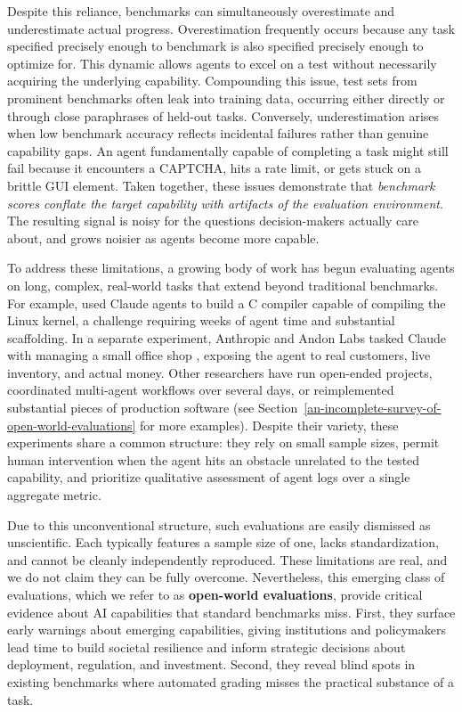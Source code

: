\documentclass{article}
\begin{document}
Despite this reliance, benchmarks can simultaneously overestimate and underestimate actual progress. Overestimation frequently occurs because any task specified precisely enough to benchmark is also specified precisely enough to optimize for. This dynamic allows agents to excel on a test without necessarily acquiring the underlying capability. Compounding this issue, test sets from prominent benchmarks often leak into training data, occurring either directly or through close paraphrases of held-out tasks. Conversely, underestimation arises when low benchmark accuracy reflects incidental failures rather than genuine capability gaps. An agent fundamentally capable of completing a task might still fail because it encounters a CAPTCHA, hits a rate limit, or gets stuck on a brittle GUI element. Taken together, these issues demonstrate that \emph{benchmark scores conflate the target capability with artifacts of the evaluation environment}. The resulting signal is noisy for the questions decision-makers actually care about, and grows noisier as agents become more capable.

To address these limitations, a growing body of work has begun evaluating agents on long, complex, real-world tasks that extend beyond traditional benchmarks. For example, \citet{anthropicComEngineeringBuilding} used Claude agents to build a C compiler capable of compiling the Linux kernel, a challenge requiring weeks of agent time and substantial scaffolding. In a separate experiment, Anthropic and Andon Labs tasked Claude with managing a small office shop \citep{anthropicComResearchProject2}, exposing the agent to real customers, live inventory, and actual money. Other researchers have run open-ended projects, coordinated multi-agent workflows over several days, or reimplemented substantial pieces of production software (see Section~\ref{an-incomplete-survey-of-open-world-evaluations} for more examples). Despite their variety, these experiments share a common structure: they rely on small sample sizes, permit human intervention when the agent hits an obstacle unrelated to the tested capability, and prioritize qualitative assessment of agent logs over a single aggregate metric.

Due to this unconventional structure, such evaluations are easily dismissed as unscientific. Each typically features a sample size of one, lacks standardization, and cannot be cleanly independently reproduced. These limitations are real, and we do not claim they can be fully overcome. Nevertheless, this emerging class of evaluations, which we refer to as \textbf{open-world evaluations}, provide critical evidence about AI capabilities that standard benchmarks miss. First, they surface early warnings about emerging capabilities, giving institutions and policymakers lead time to build societal resilience and inform strategic decisions about deployment, regulation, and investment. Second, they reveal blind spots in existing benchmarks where automated grading misses the practical substance of a task.
\end{document}
